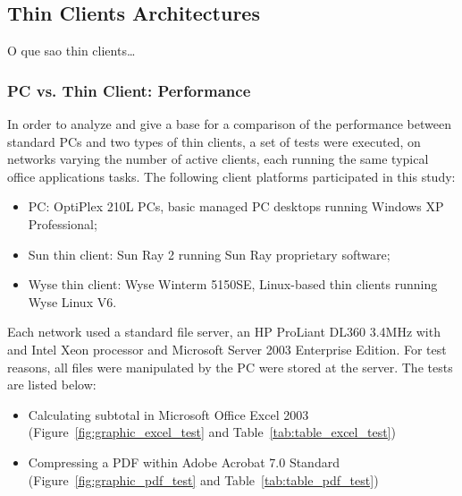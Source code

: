         \subsection{Thin Clients Architectures} \label{sec2:thin_clients}
            O que sao thin clients\ldots
            
            \subsubsection*{PC vs. Thin Client: Performance}
                In order to analyze and give a base for a comparison of the performance between standard PCs and two types of thin clients, a set of tests were executed, on networks varying the number of active clients, each running the same typical office applications tasks. The following client platforms participated in this study:
                \begin{itemize}
                    \item PC: OptiPlex 210L PCs, basic managed PC desktops running Windows XP Professional;
                    \item Sun thin client: Sun Ray 2 running Sun Ray proprietary software;
                    \item Wyse thin client: Wyse Winterm 5150SE, Linux-based thin clients running Wyse Linux V6.
                \end{itemize}
                Each network used a standard file server, an HP ProLiant DL360 3.4MHz with and Intel Xeon processor and Microsoft Server 2003 Enterprise Edition. For test reasons, all files were manipulated by the PC were stored at the server. The tests are listed below:
                \begin{itemize}
                    \item Calculating subtotal in Microsoft Office Excel 2003 (Figure~\ref{fig:graphic_excel_test} and Table~\ref{tab:table_excel_test})
                    \item Compressing a PDF within Adobe Acrobat 7.0 Standard (Figure~\ref{fig:graphic_pdf_test} and Table~\ref{tab:table_pdf_test})
                \end{itemize}
                
